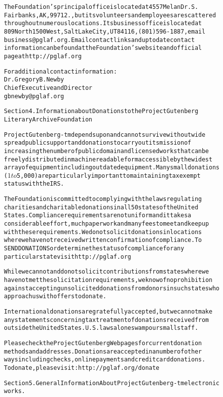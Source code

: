 \documentclass[12pt,oneside]{book}[2007/10/19]
\newenvironment{PGtext}{%
  \begin{alltt}
  \fontsize{9}{10}\ttfamily\selectfont}%
  {\end{alltt}%
}
\begin{document}
\begin{PGtext}
The Foundation's principal office is located at 4557 Melan Dr. S.
Fairbanks, AK, 99712., but its volunteers and employees are scattered
throughout numerous locations.  Its business office is located at
809 North 1500 West, Salt Lake City, UT 84116, (801) 596-1887, email
business@pglaf.org.  Email contact links and up to date contact
information can be found at the Foundation's web site and official
page at http://pglaf.org

For additional contact information:
     Dr. Gregory B. Newby
     Chief Executive and Director
     gbnewby@pglaf.org


Section 4.  Information about Donations to the Project Gutenberg
Literary Archive Foundation

Project Gutenberg-tm depends upon and cannot survive without wide
spread public support and donations to carry out its mission of
increasing the number of public domain and licensed works that can be
freely distributed in machine readable form accessible by the widest
array of equipment including outdated equipment.  Many small donations
($1 to $5,000) are particularly important to maintaining tax exempt
status with the IRS.

The Foundation is committed to complying with the laws regulating
charities and charitable donations in all 50 states of the United
States.  Compliance requirements are not uniform and it takes a
considerable effort, much paperwork and many fees to meet and keep up
with these requirements.  We do not solicit donations in locations
where we have not received written confirmation of compliance.  To
SEND DONATIONS or determine the status of compliance for any
particular state visit http://pglaf.org

While we cannot and do not solicit contributions from states where we
have not met the solicitation requirements, we know of no prohibition
against accepting unsolicited donations from donors in such states who
approach us with offers to donate.

International donations are gratefully accepted, but we cannot make
any statements concerning tax treatment of donations received from
outside the United States.  U.S. laws alone swamp our small staff.

Please check the Project Gutenberg Web pages for current donation
methods and addresses.  Donations are accepted in a number of other
ways including checks, online payments and credit card donations.
To donate, please visit: http://pglaf.org/donate


Section 5.  General Information About Project Gutenberg-tm electronic
works.


\end{PGtext}
\end{document}
